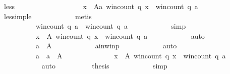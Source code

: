 \begin{isabellebody}
\ less\isanewline
\ \ \ \ \ \ \ \ \isamarkupfalse%
\isanewline
\ \ \ \ \ \ \ \ \ \ {\isachardoublequoteopen}{\isasymforall}x\ {\isasymin}\ A{\isacharminus}{\kern0pt}{\isacharbraceleft}{\kern0pt}a{\isacharbraceright}{\kern0pt}{\isachardot}{\kern0pt}\ win{\isacharunderscore}{\kern0pt}count\ q\ x\ {\isasymle}\ win{\isacharunderscore}{\kern0pt}count\ q\ a{\isachardoublequoteclose}\isanewline
\ \ \ \ \ \ \ \ \ \ \isamarkupfalse%
\ less{\isacharunderscore}{\kern0pt}imp{\isacharunderscore}{\kern0pt}le\isanewline
\ \ \ \ \ \ \ \ \ \ \isamarkupfalse%
\ metis\isanewline
\ \ \ \ \ \ \ \ \isamarkupfalse%
\ \isamarkupfalse%
\isanewline
\ \ \ \ \ \ \ \ \ \ {\isachardoublequoteopen}win{\isacharunderscore}{\kern0pt}count\ q\ a\ {\isasymle}\ win{\isacharunderscore}{\kern0pt}count\ q\ a{\isachardoublequoteclose}\isanewline
\ \ \ \ \ \ \ \ \ \ \isamarkupfalse%
\ simp\isanewline
\ \ \ \ \ \ \ \ \isamarkupfalse%
\ \isamarkupfalse%
\isanewline
\ \ \ \ \ \ \ \ \ \ {\isachardoublequoteopen}{\isasymforall}x\ {\isasymin}\ A{\isachardot}{\kern0pt}\ win{\isacharunderscore}{\kern0pt}count\ q\ x\ {\isasymle}\ win{\isacharunderscore}{\kern0pt}count\ q\ a{\isachardoublequoteclose}\isanewline
\ \ \ \ \ \ \ \ \ \ \isamarkupfalse%
\ auto\isanewline
\ \ \ \ \ \ \ \ \isamarkupfalse%
\ \isamarkupfalse%
\isanewline
\ \ \ \ \ \ \ \ \ \ {\isachardoublequoteopen}a\ {\isasymin}\ A{\isachardoublequoteclose}\isanewline
\ \ \ \ \ \ \ \ \ \ \isamarkupfalse%
\ a{\isacharunderscore}{\kern0pt}in{\isacharunderscore}{\kern0pt}win{\isacharunderscore}{\kern0pt}p\isanewline
\ \ \ \ \ \ \ \ \ \ \isamarkupfalse%
\ auto\isanewline
\ \ \ \ \ \ \ \ \isamarkupfalse%
\ \isamarkupfalse%
\isanewline
\ \ \ \ \ \ \ \ \ \ {\isachardoublequoteopen}a\ {\isasymin}\ {\isacharbraceleft}{\kern0pt}a\ {\isasymin}\ A{\isachardot}{\kern0pt}\isanewline
\ \ \ \ \ \ \ \ \ \ \ \ \ \ {\isasymforall}x\ {\isasymin}\ A{\isachardot}{\kern0pt}\ win{\isacharunderscore}{\kern0pt}count\ q\ x\ {\isasymle}\ win{\isacharunderscore}{\kern0pt}count\ q\ a{\isacharbraceright}{\kern0pt}{\isachardoublequoteclose}\isanewline
\ \ \ \ \ \ \ \ \ \ \isamarkupfalse%
\ auto\isanewline
\ \ \ \ \ \ \ \ \isamarkupfalse%
\ {\isacharquery}{\kern0pt}thesis\isanewline
\ \ \ \ \ \ \ \ \ \ \isamarkupfalse%
\ simp\isanewline
\ \ \ \ \ \ \isamarkupfalse%

\end{isabellebody}
